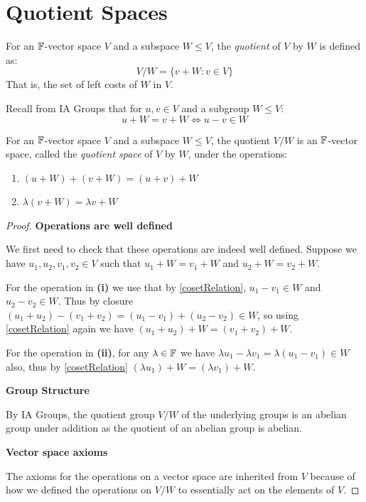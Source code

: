 \documentclass[../main.tex]{subfiles}
\begin{document}
\section{Quotient Spaces}
\begin{definition}[Quotient]
  For an $\mathbb{F}$-vector space $V$ and a subspace $W \leq V$, the \textit{quotient} of $V$ by $W$ is defined as:
  \[
    V / W = \{v + W: v \in V\}
  \]
  That is, the set of left costs of $W$ in $V$.
\end{definition}
\begin{remark}[Recap]
  Recall from IA Groups that for $u, v \in V$ and a subgroup $W \leq V$:
  \begin{equation}
    u + W = v + W \iff u - v \in W \label{cosetRelation}
  \end{equation}
\end{remark}
\begin{proposition}
  For an $\mathbb{F}$-vector space $V$ and a subspace $W \leq V$, the quotient $V / W$ is an $\mathbb{F}$-vector space, called the \textit{quotient space} of $V$ by $W$, under the operations:
  \begin{enumerate}
    \item $(u + W) + (v + W) = (u + v) + W$
    \item $\lambda(v + W) = \lambda v + W$
  \end{enumerate}
\end{proposition}
\begin{proof}\par
  \textbf{Operations are well defined}\par
  We first need to check that these operations are indeed well defined.
  Suppose we have $u_1, u_2, v_1, v_2 \in V$ such that $u_1 + W = v_1 + W$ and $u_2 + W = v_2 + W$.

  For the operation in \textbf{(i)} we use that by \cref{cosetRelation}, $u_1 - v_1 \in W$ and $u_2 - v_2 \in W$.
  Thus by closure $(u_1 + u_2) - (v_1 + v_2) = (u_1 - v_1) + (u_2 - v_2) \in W$, so using \cref{cosetRelation} again we have $(u_1 + u_2) + W = (v_1 + v_2) + W$.

  For the operation in \textbf{(ii)}, for any $\lambda \in \mathbb{F}$ we have $\lambda u_1 - \lambda v_1 = \lambda(u_1 - v_1) \in W$ also, thus by \cref{cosetRelation} $(\lambda u_1) + W = (\lambda v_1) + W$.

  \textbf{Group Structure}\par
  By IA Groups, the quotient group $V / W$ of the underlying groups is an abelian group under addition as the quotient of an abelian group is abelian.

  \textbf{Vector space axioms}\par
  The axioms for the operations on a vector space are inherited from $V$ because of how we defined the operations on $V / W$ to essentially act on the elements of $V$.
\end{proof}
\end{document}
